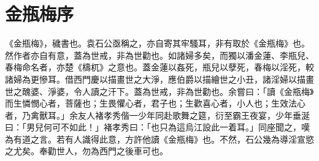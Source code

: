 \chapter*{金瓶梅序}


《金瓶梅》，穢書也。袁石公亟稱之，亦自寄其牢騷耳，非有取於《金瓶梅》也。然作者亦自有意，蓋為世戒，非為世勸也。如諸婦多矣，而獨以潘金蓮、李瓶兒、春梅命名者，亦楚《檮杌》之意也。蓋金蓮以姦死，瓶兒以孽死，春梅以淫死，較諸婦為更慘耳。借西門慶以描畫世之大淨，應伯爵以描繪世之小丑，諸淫婦以描畫世之醜婆、淨婆，令人讀之汗下。蓋為世戒，非為世勸也。余嘗曰：「讀《金瓶梅》而生憐憫心者，菩薩也；生畏懼心者，君子也；生歡喜心者，小人也；生效法心者，乃禽獸耳。」余友人褚孝秀偕一少年同赴歌舞之筵，衍至霸王夜宴，少年垂涎曰：「男兒何可不如此！」褚孝秀曰：「也只為這烏江設此一着耳。」同座聞之，嘆為有道之言。若有人識得此意，方許他讀《金瓶梅》也。不然，石公幾為導淫宣慾之尤矣。奉勸世人，勿為西門之後車可也。

\begin{quotation}
\end{quotation}

